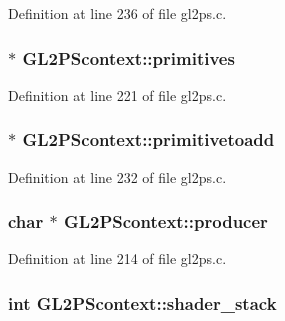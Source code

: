 Definition at line 236 of file gl2ps.\+c.

\hypertarget{struct_g_l2_p_scontext_a8f67bda6d892a406bd1af48e8717b17e}{}
\subsubsection[{primitives}]{$\ast$ G\+L2\+P\+Scontext\+::primitives}\label{struct_g_l2_p_scontext_a8f67bda6d892a406bd1af48e8717b17e}


Definition at line 221 of file gl2ps.\+c.

\hypertarget{struct_g_l2_p_scontext_a72d1e9da86c97a3b6e366dd0ee85e85b}{}
\subsubsection[{primitivetoadd}]{$\ast$ G\+L2\+P\+Scontext\+::primitivetoadd}\label{struct_g_l2_p_scontext_a72d1e9da86c97a3b6e366dd0ee85e85b}


Definition at line 232 of file gl2ps.\+c.

\hypertarget{struct_g_l2_p_scontext_a2b24e5b12218fe845a0cd7aedc1abb20}{}
\subsubsection[{producer}]{\setlength{\rightskip}{0pt plus 5cm}char $\ast$ G\+L2\+P\+Scontext\+::producer}\label{struct_g_l2_p_scontext_a2b24e5b12218fe845a0cd7aedc1abb20}


Definition at line 214 of file gl2ps.\+c.

\hypertarget{struct_g_l2_p_scontext_a46bb1de926cfd28ae8318ce99b5b0930}{}
\subsubsection[{shader\+\_\+stack}]{\setlength{\rightskip}{0pt plus 5cm}int G\+L2\+P\+Scontext\+::shader\+\_\+stack}\label{struct_g_l2_p_scontext_a46bb1de926cfd28ae8318ce99b5b0930}


